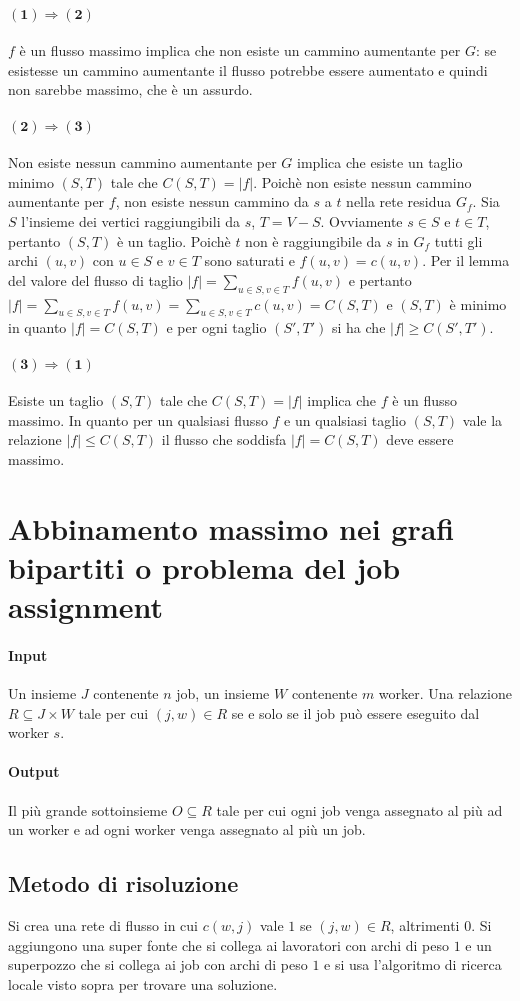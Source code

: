 \paragraph{$\mathbf{(1)\Rightarrow(2)}$}
$f$ \`e un flusso massimo implica che non esiste un cammino aumentante per $G$: se esistesse un cammino aumentante il flusso potrebbe essere aumentato e quindi non sarebbe massimo, che
\`e un assurdo.
\paragraph{$\mathbf{(2)\Rightarrow(3)}$}
Non esiste nessun cammino aumentante per $G$ implica che esiste un taglio minimo $(S, T)$ tale che $C(S, T)=|f|$. Poich\`e non esiste nessun cammino aumentante per $f$, non esiste nessun
cammino da $s$ a $t$ nella rete residua $G_f$. Sia $S$ l'insieme dei vertici raggiungibili da $s$, $T=V-S$. Ovviamente $s\in S$ e $t\in T$, pertanto $(S, T)$ \`e un taglio. Poich\`e
$t$ non \`e raggiungibile da $s$ in $G_f$ tutti gli archi $(u, v)$ con $u\in S$ e $v\in T$ sono saturati e $f(u, v) = c(u, v)$. Per il lemma del valore del flusso di taglio
$|f| = \sum\limits_{u\in S, v\in T} f(u, v)$ e pertanto $|f|=\sum\limits_{u\in S, v\in T}f(u, v) = \sum\limits_{u\in S, v\in T}c(u, v) = C(S, T)$ e $(S, T)$ \`e minimo in quanto $|f| = 
C(S, T)$ e per ogni taglio $(S', T')$ si ha che $|f|\ge C(S', T')$. 
\paragraph{$\mathbf{(3)\Rightarrow(1)}$}
Esiste un taglio $(S, T)$ tale che $C(S, T) = |f|$ implica che $f$ \`e un flusso massimo. In quanto per un qualsiasi flusso $f$ e un qualsiasi taglio $(S, T)$ vale la relazione
$|f|\le C(S, T)$ il flusso che soddisfa $|f|=C(S, T)$ deve essere massimo. 
\section{Abbinamento massimo nei grafi bipartiti o problema del job assignment}
\paragraph{Input}
Un insieme $J$ contenente $n$ job, un insieme $W$ contenente $m$ worker. Una relazione $R\subseteq J\times W$ tale per cui $(j, w)\in R$ se e solo se il job pu\`o essere eseguito dal
worker $s$.
\paragraph{Output}
Il pi\`u grande sottoinsieme $O\subseteq R$ tale per cui ogni job venga assegnato al pi\`u ad un worker e ad ogni worker venga assegnato al pi\`u un job.
\subsection{Metodo di risoluzione}
Si crea una rete di flusso in cui $c(w, j)$ vale $1$ se $(j, w)\in R$, altrimenti $0$. Si aggiungono una super fonte che si collega ai lavoratori con archi di peso $1$ e un
superpozzo che si collega ai job con archi di peso $1$ e si usa l'algoritmo di ricerca locale visto sopra per trovare una soluzione.
